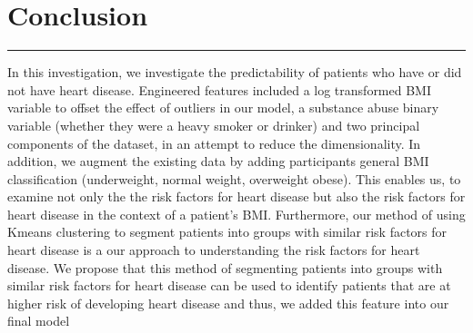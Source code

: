 \documentclass[letterpaper,10pt,english]{jupyterBook}
\begin{document}
\chapter{Conclusion}
\label{\detokenize{Conclusion:conclusion}}\label{\detokenize{Conclusion::doc}}

\bigskip\hrule\bigskip


\sphinxAtStartPar
In this investigation, we investigate the predictability of patients who have or did not have heart disease. Engineered features included a log transformed BMI variable to offset the effect of outliers in our model, a substance abuse binary variable (whether they were a heavy smoker or drinker) and two principal components of the dataset, in an attempt to reduce the dimensionality.  In addition, we augment the existing data by adding participants general BMI classification (underweight, normal weight, overweight obese). This enables us, to examine not only the the risk factors for heart disease but also the risk factors for heart disease in the context of a patient’s BMI.  Furthermore, our method of using K\sphinxhyphen{}means clustering to segment patients into groups with similar risk factors for heart disease is a our approach to understanding the risk factors for heart disease. We propose that this method of segmenting patients into groups with similar risk factors for heart disease can be used to identify patients that are at higher risk of developing heart disease and thus, we added this feature into our final model
\end{document}
